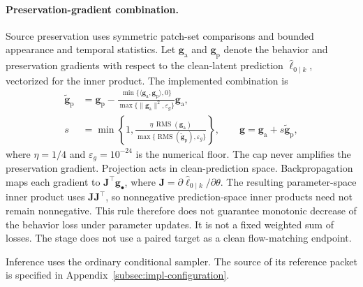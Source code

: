 \paragraph{Preservation-gradient combination.}
Source preservation uses symmetric patch-set comparisons and bounded
appearance and temporal statistics. Let $\mathbf g_{\mathrm a}$ and
$\mathbf g_{\mathrm p}$ denote the behavior and preservation gradients with
respect to the clean-latent prediction
$\widehat{\boldsymbol\ell}_{0\mid k}$, vectorized for the inner product.
The implemented combination is
\begin{equation}
 \begin{aligned}
  \widetilde{\mathbf g}_{\mathrm p}
    &=\mathbf g_{\mathrm p}
      -\frac{\min\{\langle\mathbf g_{\mathrm a},\mathbf g_{\mathrm p}\rangle,0\}}
             {\max\{\|\mathbf g_{\mathrm a}\|^2,\varepsilon_g\}}
       \mathbf g_{\mathrm a},\\
  s&=\min\!\left\{1,
    \frac{\eta\,\operatorname{RMS}(\mathbf g_{\mathrm a})}
         {\max\{\operatorname{RMS}(\widetilde{\mathbf g}_{\mathrm p}),\varepsilon_g\}}
       \right\},\qquad
  \mathbf g=\mathbf g_{\mathrm a}+s\widetilde{\mathbf g}_{\mathrm p},
 \end{aligned}
 \label{eq:impl-gradient-combination}
\end{equation}
where $\eta=1/4$ and $\varepsilon_g=10^{-24}$ is the numerical floor.
The cap never amplifies the preservation gradient. Projection acts in
clean-prediction space. Backpropagation maps each gradient to
$\mathbf J^\top\mathbf g_{\bullet}$, where
$\mathbf J=\partial\widehat{\boldsymbol\ell}_{0\mid k}/\partial\theta$.
The resulting parameter-space inner product uses
$\mathbf J\mathbf J^\top$, so nonnegative prediction-space inner products
need not remain nonnegative.
This rule therefore does not guarantee monotonic decrease of the behavior
loss under parameter updates. It is not a fixed weighted sum of losses.
The stage does not use a paired target as a clean flow-matching endpoint.

Inference uses the ordinary conditional sampler. The source of its
reference packet is specified in Appendix~\ref{subsec:impl-configuration}.

